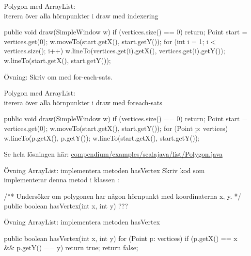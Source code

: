 \begin{Slide}{Polygon med ArrayList: \\iterera över alla hörnpunkter i draw med indexering}
\begin{Code}[numberstyle=,language=Java]
    public void draw(SimpleWindow w) {
        if (vertices.size() == 0) {
            return;
        }
        Point start = vertices.get(0);
        w.moveTo(start.getX(), start.getY());
        for (int i = 1; i < vertices.size(); i++) {
            w.lineTo(vertices.get(i).getX(), 
                     vertices.get(i).getY());
        }
        w.lineTo(start.getX(), start.getY());
    }
\end{Code}

Övning: Skriv om med for-each-sats.
\end{Slide}

\begin{Slide}{Polygon med ArrayList: \\iterera över alla hörnpunkter i draw med foreach-sats}
\begin{Code}[numberstyle=,language=Java]
    public void draw(SimpleWindow w) {
        if (vertices.size() == 0) {
            return;
        }
        Point start = vertices.get(0);
        w.moveTo(start.getX(), start.getY());
        for (Point p: vertices){
            w.lineTo(p.getX(), p.getY());
        }
        w.lineTo(start.getX(), start.getY());
    }
\end{Code}

Se hela lösningen här:
\href{https://github.com/lunduniversity/introprog/tree/master/compendium/examples/scalajava/list/Polygon.java}{compendium/examples/scalajava/list/Polygon.java}
\end{Slide}

\begin{Slide}{Övning ArrayList: implementera metoden hasVertex}
Skriv kod som implementerar denna metod i klassen :
\begin{Code}[numberstyle=,language=Java]
/** Undersöker om polygonen har någon hörnpunkt med koordinaterna x, y. */ 
public boolean hasVertex(int x, int y) {
    ???
} 
\end{Code}
\end{Slide}

\begin{Slide}{Övning ArrayList: implementera metoden hasVertex}
\begin{Code}[numberstyle=,language=Java]
    public boolean hasVertex(int x, int y) {
        for (Point p: vertices) {
            if (p.getX() == x && p.getY() == y) {
                return true;
            }
        }
        return false;
    }
\end{Code}
\end{Slide}


